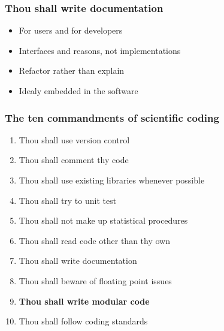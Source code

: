 \documentclass[slidestop]{beamer}
\begin{document}
\begin{frame}
  \frametitle{Thou shall write documentation}
  \begin{itemize}
    \item For users and for developers
    \item Interfaces and reasons, not implementations
    \item Refactor rather than explain
    \item Idealy embedded in the software
  \end{itemize}
\end{frame}

{
  \frame{}
}

\begin{frame}
  \frametitle{The ten commandments of scientific coding}
  \begin{enumerate}
    \item Thou shall use version control
    \item Thou shall comment thy code
    \item Thou shall use existing libraries whenever possible
    \item Thou shall try to unit test
    \item Thou shall not make up statistical procedures
    \item Thou shall read code other than thy own
    \item Thou shall write documentation
    \item Thou shall beware of floating point issues
    \item {\bf Thou shall write modular code}
    \item Thou shall follow coding standards
  \end{enumerate}
\end{frame}
\end{document}
